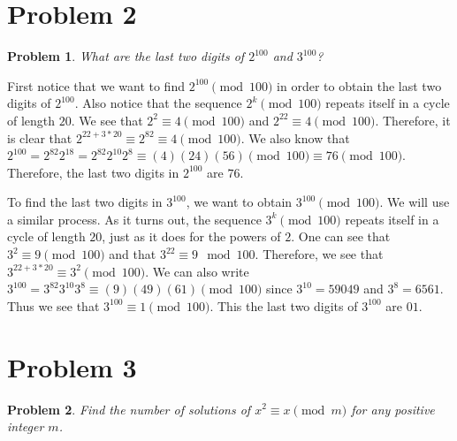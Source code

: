 \documentclass[psamsfonts]{amsart}
\newtheorem{prob}{Problem}[section]
\newenvironment{sol}{{\bfseries Solution}}{\qedsymbol}
\theoremstyle{definition}
\theoremstyle{remark}
\numberwithin{equation}{section}
\begin{document}
\section{Problem 2}

\begin{prob}
What are the last two digits of $2^{100}$ and $3^{100}$?
\end{prob}

\begin{sol}
First notice that we want to find $2^{100} \pmod{100}$ in order to obtain the last two digits of $2^{100}$. Also notice that the sequence $2^{k} \pmod{100}$ repeats itself in a cycle of length $20$. We see that $2^2 \equiv 4 \pmod{100}$ and $2^{22} \equiv 4 \pmod{100}$. Therefore, it is clear that $2^{{22 + 3*20}} \equiv 2^{82} \equiv 4 \pmod{100}$. We also know that $2^{100} = 2^{82} 2^{18} = 2^{82} 2^{10} 2^{8} \equiv (4)(24)(56) \pmod{100} \equiv 76 \pmod{100}$. Therefore, the last two digits in $2^{100}$ are $76$. 

To find the last two digits in $3^{100}$, we want to obtain $3^{100} \pmod{100}$. We will use a similar process. As it turns out, the sequence $3^{k} \pmod{100}$ repeats itself in a cycle of length $20$, just as it does for the powers of $2$. One can see that $3^2 \equiv 9 \pmod{100}$ and that $3^{22} \equiv 9 \mod{100}$. Therefore, we see that $3^{22 + 3*20} \equiv 3^{2} \pmod{100}$. We can also write $3^{100} = 3^{82} 3^{10} 3^{8} \equiv (9)(49)(61) \pmod{100}$ since $3^{10} = 59049$ and $3^8 = 6561$. Thus we see that $3^{100} \equiv 1 \pmod{100}$. This the last two digits of $3^{100}$ are $01$.  
\end{sol}

\section{Problem 3}

\begin{prob}
Find the number of solutions of $x^2 \equiv x \pmod{m}$ for any positive integer $m$. 
\end{prob}
\end{document}
